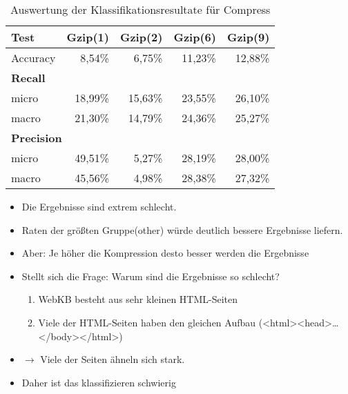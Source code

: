\begin{frame}[c]
\begin{itemize}
\begin{table}[htbp]
\begin{tabular}{|l|r|r|r|r|}
\hline
\textbf{Test} & \textbf{Gzip(1)} & \textbf{Gzip(2)} &
\textbf{Gzip(6)} & \textbf{Gzip(9)} \\ \hline Accuracy & 8,54\% & 6,75\% & 11,23\% & 12,88\% \\ \hline
\multicolumn{5}{|l|}{\textbf{Recall}}  \\ \hline micro & 18,99\% & 15,63\% &
23,55\% & 26,10\% \\ \hline macro & 21,30\% & 14,79\% & 24,36\% & 25,27\% \\ \hline
\multicolumn{5}{|l|}{\textbf{Precision}}  \\ \hline micro & 49,51\% & 5,27\% &
28,19\% & 28,00\% \\ \hline macro & 45,56\% & 4,98\% & 28,38\% & 27,32\% \\ \hline
\end{tabular}
\caption{Auswertung der Klassifikationsresultate für Compress}
\label{tbl:GzipAccuResults}
\end{table}
  
\end{itemize}
\end{frame}

\begin{frame}[c]
\begin{itemize}
  \item Die Ergebnisse sind extrem schlecht. 
  \item Raten der größten Gruppe(other) würde deutlich bessere Ergebnisse
  liefern.
  \item Aber: Je höher die Kompression desto besser werden die Ergebnisse
  \item Stellt sich die Frage: Warum sind die Ergebnisse so schlecht?
  \begin{enumerate}
  \item WebKB besteht aus sehr kleinen HTML-Seiten
  \item Viele der HTML-Seiten haben den gleichen Aufbau
  (<html><head>\ldots</body></html>)
\end{enumerate}
\item $\rightarrow$ Viele der Seiten ähneln sich stark.
\item Daher ist das klassifizieren schwierig
\end{itemize}
\end{frame}

